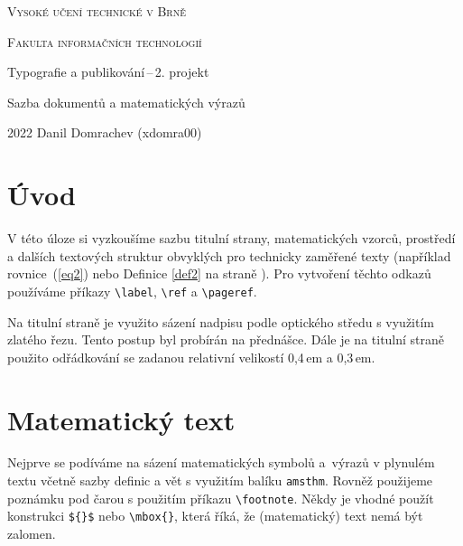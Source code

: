 \documentclass[twocolumn,a4paper,11pt,draft]{article}
\theoremstyle{definition}
\begin{document}
	\label{chap}
	\begin{titlepage}
		\begin{center}	
			\addtolength{\parskip}{0.4em}
			{\Huge
			\textsc{
			Vysoké učení technické v Brně}}
		
			{\huge 
			 \textsc{
			 Fakulta informačních technologií}}
		 
			\addtolength{\parskip}{0.3em}
			{\LARGE
			Typografie a publikování\,--\,2. projekt
			
			Sazba dokumentů a matematických výrazů}

		\end{center}
		{\Large 
		2022 \hfill Danil Domrachev (xdomra00)}
	\end{titlepage}

	\newpage
	\label{p1}
	\section*{Úvod}
	
	V této úloze si vyzkoušíme sazbu titulní strany, matematických vzorců, prostředí a dalších textových struktur obvyklých pro technicky zaměřené texty (například rovnice~(\ref{eq2}) nebo Definice \ref{def2} na straně \pageref{p1}). Pro vytvoření těchto odkazů používáme příkazy \verb!\label!, \verb!\ref! a \verb!\pageref!.
	
	Na titulní straně je využito sázení nadpisu podle optického středu s využitím zlatého řezu. Tento postup byl probírán na přednášce. Dále je na titulní straně použito odřádkování se zadanou relativní velikostí 0,4\,em a 0,3\,em.
	
	\section{Matematický text}
	Nejprve se podíváme na sázení matematických symbolů a~výrazů v plynulém textu včetně sazby definic a vět s využitím balíku \texttt{amsthm}. Rovněž použijeme poznámku pod čarou s použitím příkazu \verb!\footnote!. Někdy je vhodné použít konstrukci \verb!${}$! nebo \verb!\mbox{}!, která říká, že (matematický) text nemá být zalomen.
	
\end{document}
